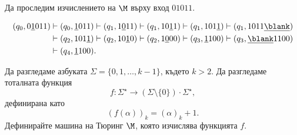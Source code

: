 \begin{example}
Да проследим изчислението на $\M$ върху вход $01011$.

\begin{align*}
  (q_0, 0\underline{1}011) & \vdash (q_0,\underline{1}011) \vdash (q_1, 1\underline{0}11) \vdash (q_1, 10\underline{1}1) \vdash (q_1, 101\underline{1}) \vdash (q_1, 1011\underline{\blank})\\
  & \vdash (q_2, 101\underline{1}) \vdash (q_2, 10\underline{1}0) \vdash (q_2, 1\underline{0}00) \vdash (q_3, \underline{1}100) \vdash (q_3, \underline{\blank}1100)\\
  & \vdash (q_4, \underline{1}100).
\end{align*}
\end{example}


\begin{problem}
  Да разгледаме азбуката $\Sigma = \{0,1,\dots,k-1\}$, където $k > 2$.
  Да разгледаме тоталната функция 
  \[f:\Sigma^\star \to (\Sigma\setminus\{0\})\cdot\Sigma^\star,\]
  дефинирана като
  \[(f(\alpha))_k = (\alpha)_k + 1.\]
  Дефинирайте машина на Тюринг $\M$, която изчислява функцията $f$.
\end{problem}


